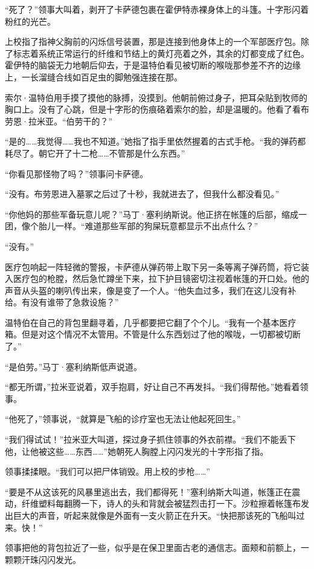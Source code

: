 \documentclass[AutoFakeBold=true]{book}
\begin{document}
``死了？''领事大叫着，剥开了卡萨德包裹在霍伊特赤裸身体上的斗篷。十字形闪着粉红的光芒。

上校指了指神父胸前的闪烁信号装置，那是连接到他身体上的一个军部医疗包。除了标志着系统正常运行的纤维和节结上的黄灯亮着之外，其余的灯都变成了红色。霍伊特的脑袋无力地朝后仰去，于是温特伯看见被切断的喉咙那参差不齐的边缘上，一长溜缝合线如百足虫的脚勉强连接在那。

索尔·温特伯用手摸了摸他的脉搏，没摸到。他朝前俯过身子，把耳朵贴到牧师的胸口上。没有了心跳，但是十字形的伤痕硌着索尔的脸，却是温暖的。他看了看布劳恩·拉米亚。``伯劳干的？''

``是的……我觉得……我也不知道。''她指了指手里依然握着的古式手枪。``我的弹药都耗尽了。朝它开了十二枪……不管那是什么东西。''

``你看见那怪物了吗？''领事问卡萨德。

``没有。布劳恩进入墓冢之后过了十秒，我就进去了，但我什么都没看见。''

``你他妈的那些军备玩意儿呢？''马丁·塞利纳斯说。他正挤在帐篷的后部，缩成一团，像个胎儿一样。``难道那些军部的狗屎玩意都显示不出点什么？''

``没有。''

医疗包响起一阵轻微的警报，卡萨德从弹药带上取下另一条等离子弹药筒，将它装入医疗包的枪膛，然后急忙蹲坐下来，拉下护目镜密切注视着帐篷的开口处。他的声音从头盔的喇叭传出来，像是变了一个人。``他失血过多，我们在这儿没有补给。有没有谁带了急救设施？''

温特伯在自己的背包里翻寻着，几乎都要把它翻了个个儿。``我有一个基本医疗箱。但是对这个情况不太管用。不管是什么东西划过了他的喉咙，一切都被切断了。''

``是伯劳。''马丁·塞利纳斯低声说道。

``都无所谓，''拉米亚说着，双手抱肩，好让自己不再发抖。``我们得帮他。''她看着领事。

``他死了，''领事说，``就算是飞船的诊疗室也无法让他起死回生。''

``我们得试试！''拉米亚大叫道，探过身子抓住领事的外衣前襟。``我们不能丢下他，让他被这些……东西……''她朝死人胸膛上闪闪发光的十字形指了指。

领事揉揉眼。``我们可以把尸体销毁。用上校的步枪……''

``要是不从这该死的风暴里逃出去，{\kaishu 我们都}得死！''塞利纳斯大叫道，帐篷正在震动，纤维塑料每翻腾一下，诗人的头和背就会被猛烈击打一下。沙粒擦着帐篷布发出巨大的声音，听起来就像是外面有一支火箭正在升天。``快把那该死的飞船叫过来。快！''

领事把他的背包拉近了一些，似乎是在保卫里面古老的通信志。面颊和前额上，一颗颗汗珠闪闪发光。
\end{document}
